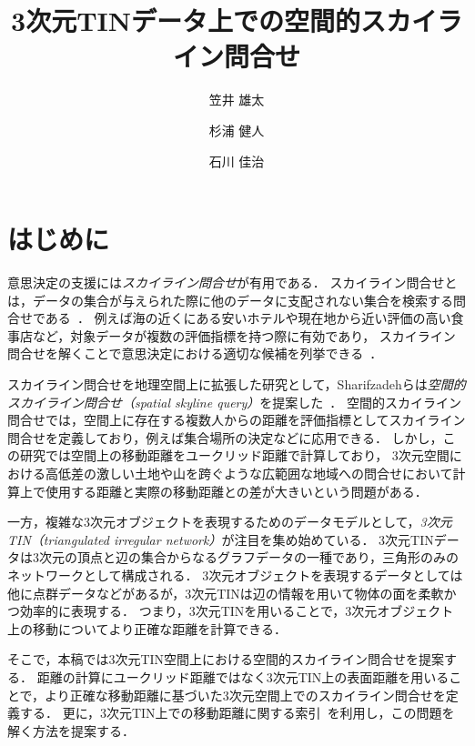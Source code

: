 \documentclass{fit}
\title
  {3次元TINデータ上での空間的スカイライン問合せ}
  {Spatial Skyline Queries on 3D TIN Data}
\author{笠井 雄太}{Yuta Kasai}{I}
\author{杉浦 健人}{Kento Sugiura}{I}
\author{石川 佳治}{Yoshiharu Ishikawa}{I}
\affiliation{I}
  {名古屋大学大学院情報学研究科}
  {Graduate School of Informatics, Nagoya University}
\theoremstyle{definition}
\begin{document}
\maketitle


\section{はじめに}

意思決定の支援には\emph{スカイライン問合せ}が有用である．
スカイライン問合せとは，データの集合が与えられた際に他のデータに支配されない集合を検索する問合せである~\cite{ICDE:borz2001}．
例えば海の近くにある安いホテルや現在地から近い評価の高い食事店など，対象データが複数の評価指標を持つ際に有効であり，
スカイライン問合せを解くことで意思決定における適切な候補を列挙できる~\cite{copr:christos2017}．

スカイライン問合せを地理空間上に拡張した研究として，Sharifzadehらは\emph{空間的スカイライン問合せ（spatial skyline query）}を提案した~\cite{vldb:shahabi2006}．
空間的スカイライン問合せでは，空間上に存在する複数人からの距離を評価指標としてスカイライン問合せを定義しており，例えば集合場所の決定などに応用できる．
しかし，この研究では空間上の移動距離をユークリッド距離で計算しており，
3次元空間における高低差の激しい土地や山を跨ぐような広範囲な地域への問合せにおいて計算上で使用する距離と実際の移動距離との差が大きいという問題がある．

一方，複雑な3次元オブジェクトを表現するためのデータモデルとして，\emph{3次元TIN（triangulated irregular network）}が注目を集め始めている．
3次元TINデータは3次元の頂点と辺の集合からなるグラフデータの一種であり，三角形のみのネットワークとして構成される．
3次元オブジェクトを表現するデータとしては他に点群データなどがあるが，3次元TINは辺の情報を用いて物体の面を柔軟かつ効率的に表現する．
つまり，3次元TINを用いることで，3次元オブジェクト上の移動についてより正確な距離を計算できる．

そこで，本稿では3次元TIN空間上における空間的スカイライン問合せを提案する．
距離の計算にユークリッド距離ではなく3次元TIN上の表面距離を用いることで，より正確な移動距離に基づいた3次元空間上でのスカイライン問合せを定義する．
更に，3次元TIN上での移動距離に関する索引~\cite{vldb:shahabi2008}を利用し，この問題を解く方法を提案する．
\end{document}
